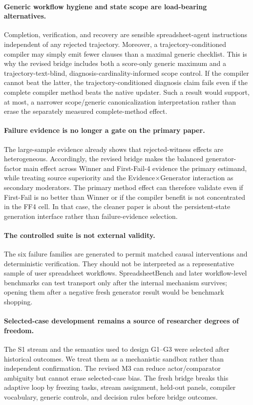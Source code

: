 \paragraph{Generic workflow hygiene and state scope are load-bearing alternatives.}
Completion, verification, and recovery are sensible spreadsheet-agent instructions independent of any rejected trajectory. Moreover, a trajectory-conditioned compiler may simply emit fewer clauses than a maximal generic checklist. This is why the revised bridge includes both a score-only generic maximum and a trajectory-text-blind, diagnosis-cardinality-informed scope control. If the compiler cannot beat the latter, the trajectory-conditioned diagnosis claim fails even if the complete compiler method beats the native updater. Such a result would support, at most, a narrower scope/generic canonicalization interpretation rather than erase the separately measured complete-method effect.

\paragraph{Failure evidence is no longer a gate on the primary paper.}
The large-sample evidence already shows that rejected-witness effects are heterogeneous. Accordingly, the revised bridge makes the balanced generator-factor main effect across Winner and First-Fail-4 evidence the primary estimand, while treating source superiority and the Evidence$\times$Generator interaction as secondary moderators. The primary method effect can therefore validate even if First-Fail is no better than Winner or if the compiler benefit is not concentrated in the FF4 cell. In that case, the cleaner paper is about the persistent-state generation interface rather than failure-evidence selection.

\paragraph{The controlled suite is not external validity.}
The six failure families are generated to permit matched causal interventions and deterministic verification. They should not be interpreted as a representative sample of user spreadsheet workflows. SpreadsheetBench and later workflow-level benchmarks can test transport only after the internal mechanism survives; opening them after a negative fresh generator result would be benchmark shopping.

\paragraph{Selected-case development remains a source of researcher degrees of freedom.}
The S1 stream and the semantics used to design G1--G3 were selected after historical outcomes. We treat them as a mechanistic sandbox rather than independent confirmation. The revised M3 can reduce actor/comparator ambiguity but cannot erase selected-case bias. The fresh bridge breaks this adaptive loop by freezing tasks, stream assignment, held-out panels, compiler vocabulary, generic controls, and decision rules before bridge outcomes.

